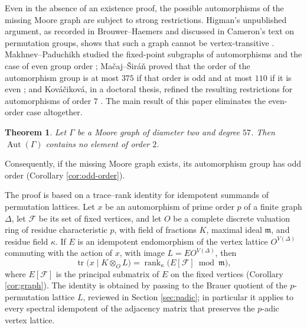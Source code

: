 \documentclass[11pt]{article}
\theoremstyle{plain}
\newtheorem{theorem}{Theorem}[section]
\theoremstyle{remark}
\newcommand{\Aut}{\operatorname{Aut}}
\newcommand{\tr}{\operatorname{tr}}
\newcommand{\rank}{\operatorname{rank}}
\begin{document}
Even in the absence of an existence proof, the possible automorphisms of the missing Moore graph are subject to strong restrictions.
Higman's unpublished argument, as recorded in Brouwer--Haemers and discussed in Cameron's text on permutation groups,
shows that such a graph cannot be vertex-transitive \cite{BrouwerHaemers,Cameron}.
Makhnev--Paduchikh studied the fixed-point subgraphs of automorphisms and the case of even group order \cite{MakhnevPaduchikh,MakhnevPaduchikh2009};
Ma\v{c}aj--\v{S}ir\'a\v{n} proved that the order of the automorphism group is at most $375$ if that order is odd and at most $110$ if it is even \cite{MacajSiran};
and Kov\'a\v{c}ikov\'a, in a doctoral thesis, refined the resulting restrictions for automorphisms of order $7$ \cite{Kovacikova}.
The main result of this paper eliminates the even-order case altogether.

\begin{theorem}\label{thm:main}
Let $\Gamma$ be a Moore graph of diameter two and degree $57$.
Then $\Aut(\Gamma)$ contains no element of order $2$.
\end{theorem}

Consequently, if the missing Moore graph exists, its automorphism group has odd order (Corollary \ref{cor:odd-order}).

The proof is based on a trace--rank identity for idempotent summands of permutation lattices.
Let $x$ be an automorphism of prime order $p$ of a finite graph $\Delta$, let $\mathcal F$ be its set of fixed vertices,
and let $O$ be a complete discrete valuation ring of residue characteristic $p$,
with field of fractions $K$, maximal ideal $\mathfrak m$, and residue field $\kappa$.
If $E$ is an idempotent endomorphism of the vertex lattice $O^{V(\Delta)}$ commuting with the action of $x$,
with image $L=EO^{V(\Delta)}$, then
\[
 \tr\bigl(x\mid K\otimes_OL\bigr)
 =\rank_{\kappa}\bigl(E[\mathcal F]\bmod\mathfrak m\bigr),
\]
where $E[\mathcal F]$ is the principal submatrix of $E$ on the fixed vertices (Corollary \ref{cor:graph}).
The identity is obtained by passing to the Brauer quotient of the $p$-permutation lattice $L$, reviewed in Section \ref{sec:padic};
in particular it applies to every spectral idempotent of the adjacency matrix that preserves the $p$-adic vertex lattice.
\end{document}
